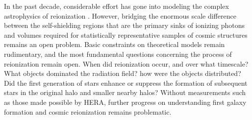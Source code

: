 \documentclass[preprint]{aastex}
\begin{document}
In the past decade, considerable effort has gone into modeling the complex astrophysics
of reionization
\citep{santos_et_al2010,mesinger_et_al2011,wyithe_loeb2004}. However, bridging the
enormous scale difference between the self-shielding regions that are the
primary sinks of ionizing photons and volumes required for statistically
representative samples of cosmic structures remains an open problem. 
Basic constraints on theoretical models remain rudimentary, and the most
fundamental questions concerning the process of reionization remain open. 
When did
reionization occur, and over what timescale?  What objects dominated the
radiation field? how were the objects distributed? Did the first generation of
stars enhance or suppress the formation of subsequent stars in the original
halo and smaller nearby halos? Without measurements such as those made possible by HERA,
further progress on understanding first galaxy formation and
cosmic reionization remains problematic. 
\end{document}
